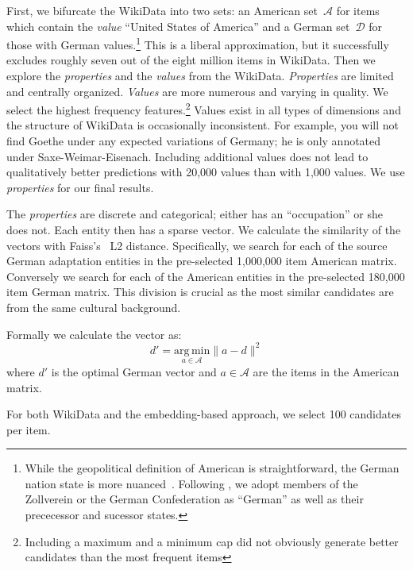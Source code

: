 First, we bifurcate the WikiData into two sets: an American
set~$\mathcal{A}$ for items which contain the \textit{value} ``United
States of America'' and a German set~$\mathcal{D}$ for those with
German values.\footnote{While the geopolitical definition of
	American is straightforward, the German nation state is more
	nuanced~\citep{schulze-91}.  Following \citet{green-03}, we adopt
	members of the Zollverein or the German Confederation as ``German''
	as well as their prececessor and sucessor states.}
%
This is a liberal approximation, but it successfully excludes roughly
seven out of the eight million items in WikiData.
%
Then we explore the \textit{properties} and the \textit{values} from
the WikiData.
%
\textit{Properties} are limited and centrally organized.
%
\textit{Values} are more numerous and varying in quality.  
%
We select the highest frequency features.\footnote{Including a maximum
	and a minimum cap did not obviously generate better candidates than
	the most frequent items}
%
Values exist in all types of dimensions and the structure of WikiData is occasionally inconsistent.
%
For example, you will not find Goethe under any expected variations of Germany; he is only annotated under Saxe-Weimar-Eisenach. 
%
Including additional values does not lead to qualitatively better predictions with 20,000 values than with 1,000 values.  
%
We use \textit{properties} for our final results. 
%

The \textit{properties} are discrete and categorical;
 either has an ``occupation'' or she does not.
%
Each entity then has a sparse vector.
%
We calculate the similarity of the vectors with Faiss's~\citep{JDH17} L2 distance.  
%
Specifically, we search for each of the source German adaptation entities in the pre-selected 1,000,000 item American matrix.
%
Conversely we search for each of the American entities in the pre-selected 180,000 item German matrix.
%
This division is crucial as the most similar candidates are from the same cultural background.  

Formally we calculate the vector as:
\begin{equation}d' = \underset{a \in \mathcal{A}}{\mathrm{arg\,min}}  \| a - d \| ^2 \end{equation}
where $d'$ is the optimal German vector and $a \in \mathcal{A}$ are the items in the American matrix.

For both WikiData and the embedding-based approach, we select 100 candidates per item. 

